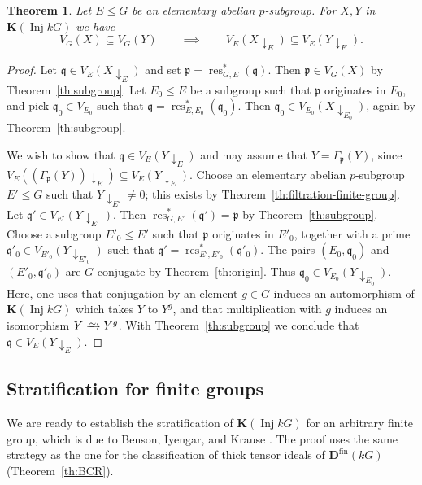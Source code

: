 \documentclass{amsart}[a4]
\newtheorem{theorem}{Theorem}[section]
\theoremstyle{definition}
\theoremstyle{remark}
\numberwithin{equation}{section}
\newcommand{\Inj}{\operatorname{Inj}}
\newcommand{\res}{\operatorname{res}}
\newcommand{\da}{{\downarrow}}
\newcommand{\iso}{\xrightarrow{\raisebox{-.6ex}[0ex][0ex]{$\scriptstyle{\sim}$}}}
\newcommand{\fin}{\mathrm{fin}}
\newcommand{\bfD}{\mathbf D}
\newcommand{\bfK}{\mathbf K}
\newcommand{\fp}{\mathfrak{p}}
\newcommand{\fq}{\mathfrak{q}}
\let\Gamma\varGamma
\begin{document}
\begin{theorem}\label{th:subgroup-elem-abelian}
Let $E\le G$ be an elementary abelian $p$-subgroup. For $X,Y$ in
$\bfK(\Inj kG)$ we have
\[V_G(X)\subseteq V_G(Y)\qquad\implies\qquad V_E(X\da_E)\subseteq V_E(Y\da_E).\]
\end{theorem}
\begin{proof}
  Let $\fq\in V_E(X\da_E)$ and set $\fp=\res^*_{G,E}(\fq)$. Then
  $\fp\in V_G(X)$ by Theorem~\ref{th:subgroup}. Let $E_0\leq E$
  be a subgroup such that $\fp$ originates in $E_0$, and pick
  $\fq_0\in V_{E_0}$ such that $\fq=\res^*_{E,E_0}(\fq_0)$. Then
  $\fq_0\in V_{E_0}(X\da_{E_0})$, again by Theorem~\ref{th:subgroup}.

  We wish to show that $\fq\in V_E(Y\da_E)$ and may assume that
  $Y=\Gamma_\fp(Y)$, since
  $V_E((\Gamma_\fp(Y))\da_E)\subseteq V_E(Y\da_E)$. Choose an
  elementary abelian $p$-subgroup $E'\leq G$ such that
  $Y\da_{E'}\neq 0$; this exists by
  Theorem~\ref{th:filtration-finite-group}. Let
  $\fq'\in V_{E'}(Y\da_{E'})$. Then $\res^*_{G,E'}(\fq')=\fp$ by
  Theorem~\ref{th:subgroup}.  Choose a subgroup $E'_0\leq E'$ such that
  $\fp$ originates in $E'_0$, together with a prime
  $\fq'_0\in V_{E'_0}(Y\da_{E'_0})$ such that
  $\fq'=\res^*_{E',E'_0}(\fq'_0)$.  The pairs $(E_0,\fq_0)$ and
  $(E'_0,\fq'_0)$ are $G$-conjugate by Theorem~\ref{th:origin}. Thus
  $\fq_0\in V_{E_0}(Y\da_{E_0})$. Here, one uses that conjugation by
  an element $g\in G$ induces an automorphism of $\bfK(\Inj kG)$ which
  takes $Y$ to $Y^g$, and that multiplication with $g$ induces an
  isomorphism $Y\iso Y^g$.  With Theorem~\ref{th:subgroup} we
  conclude that $\fq\in V_{E}(Y\da_{E})$.
\end{proof}



\subsection*{Stratification for finite groups}

We are ready to establish the stratification of $\bfK(\Inj kG)$ for an
arbitrary finite group, which is due to Benson, Iyengar, and Krause
\cite{Benson/Iyengar/Krause:2011b}.  The proof uses the same strategy
as the one for the classification of thick tensor ideals of
$\bfD^\fin(kG)$ (Theorem~\ref{th:BCR}).
\end{document}
